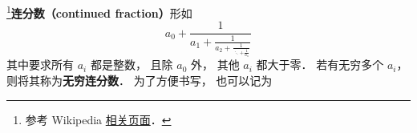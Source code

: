 
\footnote{参考 Wikipedia \href{https://en.wikipedia.org/wiki/Continued_fraction}{相关页面}．}\textbf{连分数（continued fraction）}形如
\begin{equation}
a_0 + \frac{1}{\displaystyle a_1 + \frac{1}{\displaystyle a_2 + \frac{1}{\displaystyle \ddots + \frac{1}{a_n}}}}
\end{equation}
其中要求所有 $a_i$ 都是整数， 且除 $a_0$ 外， 其他 $a_i$ 都大于零． 若有无穷多个 $a_i$， 则将其称为\textbf{无穷连分数}． 为了方便书写， 也可以记为


